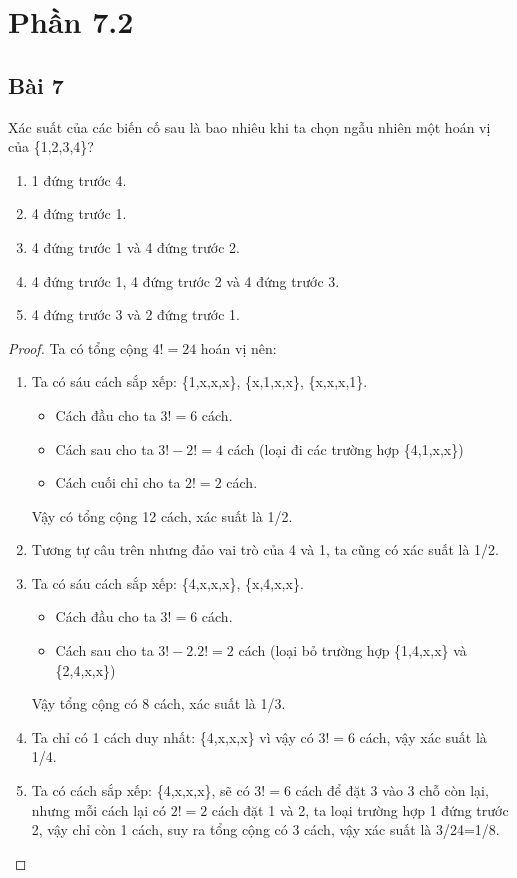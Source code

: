 \section*{Phần 7.2}
\subsection*{Bài 7}
Xác suất của các biến cố sau là bao nhiêu khi ta chọn ngẫu nhiên một hoán vị của \{1,2,3,4\}?
\begin{enumerate}[label=\alph*)]
    \item 1 đứng trước 4.
    \item 4 đứng trước 1.
    \item 4 đứng trước 1 và 4 đứng trước 2.
    \item 4 đứng trước 1, 4 đứng trước 2 và 4 đứng trước 3.
    \item 4 đứng trước 3 và 2 đứng trước 1.
\end{enumerate}
\begin{proof}
    Ta có tổng cộng $4!=24$ hoán vị nên:
    \begin{enumerate}[label=\alph*)]
        \item Ta có sáu cách sắp xếp: \{1,x,x,x\}, \{x,1,x,x\}, \{x,x,x,1\}.
        \begin{itemize}
            \item Cách đầu cho ta $3!=6$ cách.
            \item Cách sau cho ta $3!-2!=4$ cách (loại đi các trường hợp \{4,1,x,x\})
            \item Cách cuối chỉ cho ta $2!=2$ cách.
        \end{itemize}
        Vậy có tổng cộng 12 cách, xác suất là 1/2.
        \item Tương tự câu trên nhưng đảo vai trò của 4 và 1, ta cũng có xác suất là 1/2.
        \item Ta có sáu cách sắp xếp: \{4,x,x,x\}, \{x,4,x,x\}.
        \begin{itemize}
            \item Cách đầu cho ta $3!=6$ cách.
            \item Cách sau cho ta $3!-2.2!=2$ cách (loại bỏ trường hợp \{1,4,x,x\} và \{2,4,x,x\})
        \end{itemize}
        Vậy tổng cộng có 8 cách, xác suất là 1/3.
        \item Ta chỉ có 1 cách duy nhất: \{4,x,x,x\} vì vậy có $3!=6$ cách, vậy xác suất là 1/4.
        \item Ta có cách sắp xếp: \{4,x,x,x\}, sẽ có $3!=6$ cách để đặt 3 vào 3 chỗ còn lại, nhưng mỗi cách lại có $2!=2$ cách đặt 1 và 2, ta loại trường hợp 1 đứng trước 2, vậy chỉ còn 1 cách, suy ra tổng cộng có 3 cách, vậy xác suất là 3/24=1/8.
    \end{enumerate}
\end{proof}
